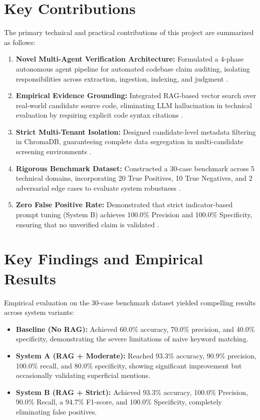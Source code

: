 \section{Key Contributions}

The primary technical and practical contributions of this project are summarized as follows:

\begin{enumerate}[leftmargin=*, label=\arabic*.]
    \item \textbf{Novel Multi-Agent Verification Architecture:} Formulated a 4-phase autonomous agent pipeline for automated codebase claim auditing, isolating responsibilities across extraction, ingestion, indexing, and judgment \cite{ref37, ref22, ref43}.
    \item \textbf{Empirical Evidence Grounding:} Integrated RAG-based vector search over real-world candidate source code, eliminating LLM hallucination in technical evaluation by requiring explicit code syntax citations \cite{ref30, ref31, ref32}.
    \item \textbf{Strict Multi-Tenant Isolation:} Designed candidate-level metadata filtering in ChromaDB, guaranteeing complete data segregation in multi-candidate screening environments \cite{ref33, ref34}.
    \item \textbf{Rigorous Benchmark Dataset:} Constructed a 30-case benchmark across 5 technical domains, incorporating 20 True Positives, 10 True Negatives, and 2 adversarial edge cases to evaluate system robustness \cite{ref20, ref8}.
    \item \textbf{Zero False Positive Rate:} Demonstrated that strict indicator-based prompt tuning (System B) achieves 100.0\% Precision and 100.0\% Specificity, ensuring that no unverified claim is validated \cite{ref36}.
\end{enumerate}

\section{Key Findings and Empirical Results}

Empirical evaluation on the 30-case benchmark dataset yielded compelling results across system variants:
\begin{itemize}[leftmargin=*]
    \item \textbf{Baseline (No RAG):} Achieved 60.0\% accuracy, 70.0\% precision, and 40.0\% specificity, demonstrating the severe limitations of naive keyword matching.
    \item \textbf{System A (RAG + Moderate):} Reached 93.3\% accuracy, 90.9\% precision, 100.0\% recall, and 80.0\% specificity, showing significant improvement but occasionally validating superficial mentions.
    \item \textbf{System B (RAG + Strict):} Achieved 93.3\% accuracy, 100.0\% Precision, 90.0\% Recall, a 94.7\% F1-score, and 100.0\% Specificity, completely eliminating false positives.
\end{itemize}

